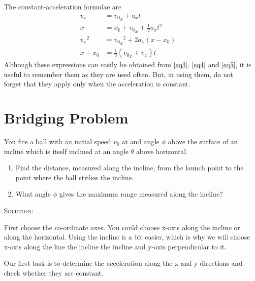 \begin{note}
The constant-acceleration formulae are
\begin{align}
v_x &= {v_0}_x+a_xt \label{eq15}\\
x&=x_0+{v_0}_x+\frac{1}{2}a_xt^2 \label{eq16}\\
{v_x}^2&={{v_0}_x}^2+2a_x(x-x_0) \label{eq17}\\
x-x_0&=\frac{1}{2}({v_0}_x+v_x)t \label{eq18}
\end{align}
Although these expressions can easily be obtained from \eqref{eq3}, \eqref{eq4} and \eqref{eq5}, it is useful to remember them as they are used often. But, in using them, do not forget that they apply only when the acceleration is constant.
\end{note}

\section{Bridging Problem}

\begin{figure}
    
\end{figure}

You fire a ball with an initial speed $v_0$ at and angle $\phi$ above the surface of an incline which is itself inclined at an angle $\theta$ above horizontal.

\begin{enumerate}[label=\alph*)]
\item Find the distance, measured along the incline, from the launch point to the point where the ball strikes the incline.
\item What angle $\phi$ gives the maximum range measured along the incline?
\end{enumerate}

\textsc{Solution:}

First choose the co-ordinate axes. You could choose x-axis along the incline or along the horizontal. Using the incline is a bit easier, which is why we will choose x-axis along the line the incline the incline and y-axis perpendicular to it.

Our first task is to determine the acceleration along the x and y directions and check whether they are constant.

\begin{figure}
    
\end{figure}


